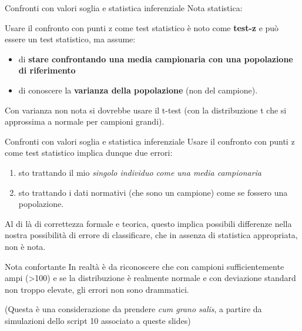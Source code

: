 \documentclass[
  ignorenonframetext,
  aspectratio=169,
]{beamer}
\providecommand{\tightlist}{%
  \setlength{\itemsep}{0pt}\setlength{\parskip}{0pt}}
\begin{document}
\begin{frame}{Confronti con valori soglia e statistica inferenziale}
\label{confronti-con-valori-soglia-e-statistica-inferenziale-2}
Nota statistica:

Usare il confronto con punti z come test statistico è noto come
\textbf{test-z} e può essere un test statistico, ma assume:

\begin{itemize}
\tightlist
\item
  di \textbf{stare confrontando una media campionaria con una
  popolazione di riferimento}
\item
  di conoscere la \textbf{varianza della popolazione} (non del
  campione).
\end{itemize}

Con varianza non nota si dovrebbe usare il t-test (con la distribuzione
t che si approssima a normale per campioni grandi).
\end{frame}

\begin{frame}{Confronti con valori soglia e statistica inferenziale}
\label{confronti-con-valori-soglia-e-statistica-inferenziale-3}
Usare il confronto con punti z come test statistico implica dunque due
errori:

\begin{enumerate}
[1)]
\tightlist
\item
  sto trattando il mio \emph{singolo individuo come una media
  campionaria}
\item
  sto trattando i dati normativi (che sono un campione) come se fossero
  una popolazione.
\end{enumerate}

Al di là di correttezza formale e teorica, questo implica possibili
differenze nella nostra possibilità di errore di classificare, che in
assenza di statistica appropriata, non è nota.
\end{frame}

\begin{frame}{Nota confortante}
\label{nota-confortante}
In realtà è da riconoscere che con campioni sufficientemente ampi
(\textgreater100) e se la distribuzione è realmente normale e con
deviazione standard non troppo elevate, gli errori non sono drammatici.

(Questa è una considerazione da prendere \emph{cum grano salis}, a
partire da simulazioni dello script 10 associato a queste slides)
\end{frame}
\end{document}
